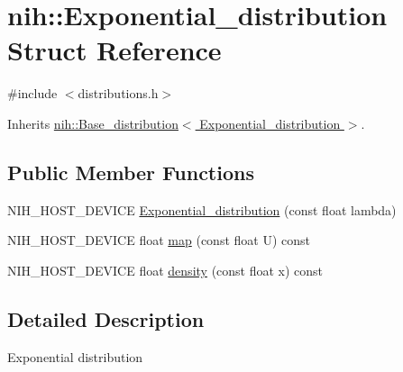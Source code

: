 \hypertarget{structnih_1_1_exponential__distribution}{
\section{nih\-:\-:\-Exponential\-\_\-distribution \-Struct \-Reference}
\label{structnih_1_1_exponential__distribution}
}


{\ttfamily \#include $<$distributions.\-h$>$}



\-Inherits \hyperlink{structnih_1_1_base__distribution}{nih\-::\-Base\-\_\-distribution$<$ Exponential\-\_\-distribution $>$}.

\subsection*{\-Public \-Member \-Functions}
\begin{DoxyCompactItemize}
\item 
\-N\-I\-H\-\_\-\-H\-O\-S\-T\-\_\-\-D\-E\-V\-I\-C\-E \hyperlink{structnih_1_1_exponential__distribution_a43395dcc56fadd2010a6eeae8cd8ba55}{\-Exponential\-\_\-distribution} (const float lambda)
\item 
\-N\-I\-H\-\_\-\-H\-O\-S\-T\-\_\-\-D\-E\-V\-I\-C\-E float \hyperlink{structnih_1_1_exponential__distribution_ab6f68de1b8219158dccf8a3f353bf8b7}{map} (const float \-U) const 
\item 
\-N\-I\-H\-\_\-\-H\-O\-S\-T\-\_\-\-D\-E\-V\-I\-C\-E float \hyperlink{structnih_1_1_exponential__distribution_af8373dc96763a892b59e078986d68351}{density} (const float x) const 
\end{DoxyCompactItemize}


\subsection{\-Detailed \-Description}
\-Exponential distribution 

